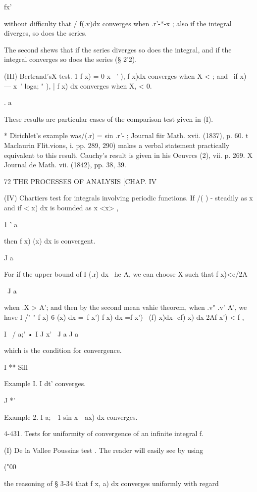 fx'

without difficulty that / f(.v)dx converges when .r'-*-x ; also if the
integral diverges, so does the series.

The second shews that if the series diverges so does the integral, and
if the integral converges so does the series (§ 2'2).

(III) Bertrand'sX test. 1 f x) = 0 x ~' ), f x)dx converges when X < ;
and \ if x) — x~' loga; " ), | f x) dx converges when X, < 0.

. a

These results are particular cases of the comparison test given in
(I).

* Dirichlet's example was/(.r) = sin .r'- ; Journal fiir Math. xvii.
(1837), p. 60. t Maclaurin Flit.vions, i. pp. 289, 290) makes a verbal
statement practically equivalent to this result. Cauchy's result is
given in his Oeuvrcs (2), vii. p. 269. X Journal de Math. vii. (1842),
pp. 38, 39.



72 THE PROCESSES OF ANALYSIS [CHAP. IV

(IV) Chartiers test for integrals involving periodic functions. If /(
) - steadily as x and if < x) dx is bounded as x <x> ,

1 ' a

then f x) (x) dx is convergent.

J a

For if the upper bound of I (.r) dx \ he A, we can choose X such that
f x)<e/2A

\ J a

when .X > A'; and then by the second mean vahie theorem, when .v" .v'
A', we have I /" " f x) 6 (x) dx =\ f x') f x) dx =f x') \ (f) x)dx-
cf) x) dx 2Af x') < f ,

I \ / a;' • I J x' \ J a J a

which is the condition for convergence.

I ** Sill

Example I. I dt' converges.

J *'

Example 2. I a; - 1 sin x - ax) dx converges.

4-431. Tests for uniformity of convergence of an infinite integral f.

(I) De la Vallee Poussins test . The reader will easily see by using

("00

the reasoning of § 3-34 that f x, a) dx converges uniformly with
regard

